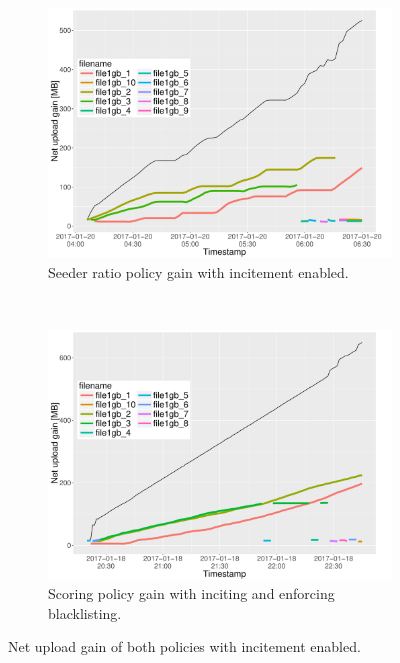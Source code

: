 \begin{figure}[h!]
	\begin{adjustwidth}{-2.5cm}{}
		\begin{subfigure}[t]{0.7\textwidth}
			\centering
			\includegraphics[width=\textwidth]{pics/results/simple3_sr_trig.pdf}
			\caption{Seeder ratio policy gain with incitement enabled.}
			\label{fig:simplesrtrig}
		\end{subfigure}
		~
		\begin{subfigure}[t]{0.7\textwidth}
			\centering
			\includegraphics[width=\textwidth]{pics/results/simple1_scsr_trig.pdf}
			\caption{Scoring policy gain with inciting and enforcing blacklisting.}
			\label{fig:simplescsrtrig}
		\end{subfigure}
		\caption{Net upload gain of both policies with incitement enabled.}
	\end{adjustwidth}
\end{figure}

